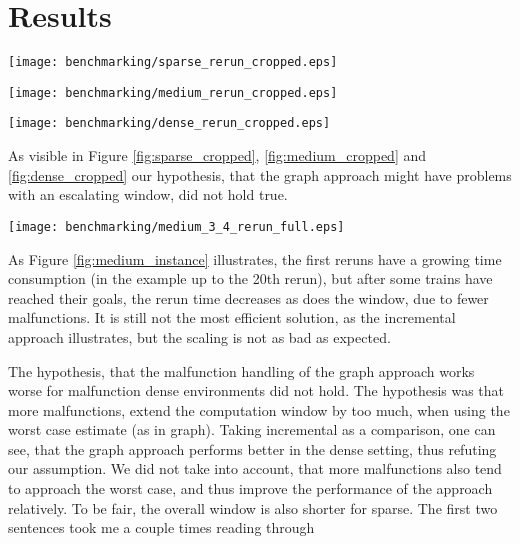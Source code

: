 \section{Results}
\begin{figure*}
    \begin{minipage}[t]{0.32\textwidth}
        \texttt{[image: benchmarking/sparse\_rerun\_cropped.eps]}
        \caption{Sparse: Reruns}
        \label{fig:sparse_cropped}
    \end{minipage}
    \begin{minipage}[t]{0.32\textwidth}
        \texttt{[image: benchmarking/medium\_rerun\_cropped.eps]}
        \caption{Medium: Reruns}
        \label{fig:medium_cropped}
    \end{minipage}
    \begin{minipage}[t]{0.32\textwidth}
        \texttt{[image: benchmarking/dense\_rerun\_cropped.eps]}
        \caption{Dense: Reruns}
        \label{fig:dense_cropped}
    \end{minipage}
\end{figure*}

As visible in Figure \ref{fig:sparse_cropped}, \ref{fig:medium_cropped} and \ref{fig:dense_cropped} our hypothesis, that the graph approach might have problems with an escalating window, did not hold true.

\begin{figure*}
	\texttt{[image: benchmarking/medium\_3\_4\_rerun\_full.eps]}
	\caption{A selected medium Instance, 3\% Malfunction\color{red} I want to explain better what the dots and the colors are\color{black}}
	\label{fig:medium_instance}
\end{figure*}


As Figure \ref{fig:medium_instance} illustrates, the first reruns have a growing time consumption (in the example up to the 20th rerun), but after some trains have reached their goals, the rerun time decreases as does the window, due to fewer malfunctions. It is still not the most efficient solution, as the incremental approach illustrates, but the scaling is not as bad as expected.

The hypothesis, that the malfunction handling of the graph approach works worse for malfunction dense environments did not hold. The hypothesis was that more malfunctions, extend the computation window by too much, when using the worst case estimate (as in graph). Taking incremental as a comparison, one can see, that the graph approach performs better in the dense setting, thus refuting our assumption. We did not take into account, that more malfunctions also tend to approach the worst case, and thus improve the performance of the approach relatively.
\color{red}To be fair, the overall window is also shorter for sparse. The first two sentences took me a couple times reading through
\color{black}

